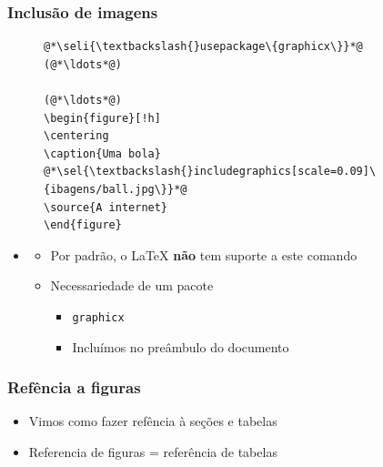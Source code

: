 \begin{frame}[fragile] \frametitle{Inclusão de imagens}
\begin{figure}[!t]
\begin{lstlisting}
@*\seli{\textbackslash{}usepackage\{graphicx\}}*@
(@*\ldots*@)

(@*\ldots*@)
\begin{figure}[!h]
\centering
\caption{Uma bola}
@*\sel{\textbackslash{}includegraphics[scale=0.09]\{ibagens/ball.jpg\}}*@
\source{A internet}
\end{figure}
\end{lstlisting}
\end{figure}

\begin{itemize}
	\item {}
	\begin{itemize}
		\item Por padrão, o LaTeX \textbf{não} tem suporte a este comando
		\item Necessariedade de um pacote
		\begin{itemize}
			\item \texttt{graphicx}
			\item Incluímos no preâmbulo do documento 
		\end{itemize}
	\end{itemize}
\end{itemize}
\end{frame}

\begin{frame}[fragile] \frametitle{Refência a figuras}

\begin{itemize}
	\item Vimos como fazer refência à seções e tabelas
	\item Referencia de figuras = referência de tabelas
\end{itemize}

\end{frame}

